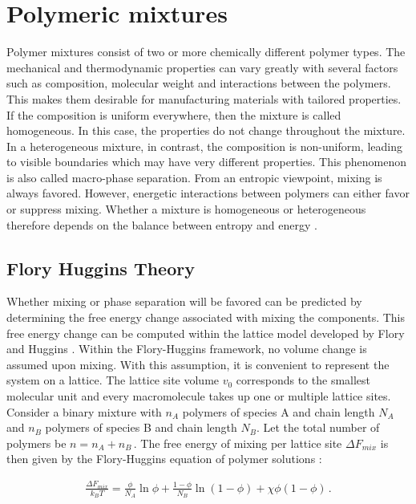\documentclass[bachelor,       %
               twoside,        %
               BCOR10mm,       %
                ngerman,english  %
               ]{GAUBM}
\begin{document}
\section{Polymeric mixtures}
Polymer mixtures consist of two or more chemically different polymer types. The mechanical and thermodynamic properties can vary greatly with several factors such as composition, molecular weight and interactions between the polymers. This makes them desirable for manufacturing materials with tailored properties.\\
If the composition is uniform everywhere, then the mixture is called homogeneous. In this case, the properties do not change throughout the mixture. In a heterogeneous mixture, in contrast, the composition is non-uniform, leading to visible boundaries which may have very different properties. This phenomenon is also called macro-phase separation. From an entropic viewpoint, mixing is always favored. However, energetic interactions between polymers can either favor or suppress mixing. Whether a mixture is homogeneous or heterogeneous therefore depends on the balance between entropy and energy \cite[S. 137]{Rubin03}.           

\subsection{Flory Huggins Theory}

Whether mixing or phase separation will be favored can be predicted by determining the free energy change associated with mixing the components. This free energy change can be computed within the lattice model developed by Flory and Huggins \cite{Flory42}. Within the Flory-Huggins framework, no volume change is assumed upon mixing. With this assumption, it is convenient to represent the system on a lattice. The lattice site volume $v_0$ corresponds to the smallest molecular unit and every macromolecule takes up one or multiple lattice sites. Consider a binary mixture with $n_A$ polymers of species A and chain length $N_A$ and $n_B$ polymers of species B and chain length $N_B$. Let the total number of polymers be $n=n_A+n_B\,.$ The free energy of mixing per lattice site $\Delta F_{mix}$ is then given by the Flory-Huggins equation of polymer solutions \cite[S. 143]{Rubin03}:

\begin{align}
  \frac{\Delta F_{mix}}{k_BT}=\frac{\phi}{N_A}\ln\phi+\frac{1-\phi}{N_B}\ln(1-\phi)+\chi\phi(1-\phi)\,.
\end{align}
\end{document}
